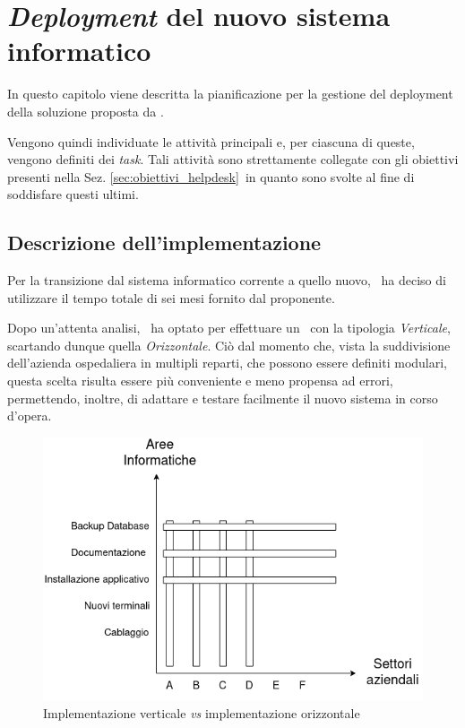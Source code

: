 \chapter{\textit{Deployment} del nuovo sistema informatico}\label{ch:implementazione}

In questo capitolo viene descritta la pianificazione per la gestione del deployment della soluzione proposta da \azienda.


Vengono quindi individuate le attività principali e, per ciascuna di queste, vengono definiti dei \textit{task}.
Tali attività sono strettamente collegate con gli obiettivi presenti nella Sez. \ref{sec:obiettivi_helpdesk}~in quanto sono svolte al fine di soddisfare questi ultimi.

\section{Descrizione dell’implementazione}\label{sec:desc_implementazione}

	Per la transizione dal sistema informatico corrente a quello nuovo, \azienda~ha deciso di utilizzare il tempo totale di sei mesi fornito dal proponente.
	
	Dopo un'attenta analisi, \azienda~ha optato per effettuare un \rollout~con la tipologia \textit{Verticale}, scartando dunque quella \textit{Orizzontale}.
	Ciò dal momento che, vista la suddivisione dell'azienda ospedaliera in multipli reparti, che possono essere definiti modulari, questa scelta risulta essere più conveniente e meno propensa ad errori, permettendo, inoltre, di adattare e testare facilmente il nuovo sistema in corso d'opera.
	
	\begin{figure}[h!]
		\centering
		\includegraphics[width=\linewidth]{img/implementazione.png}
		\caption{Implementazione verticale \textit{vs} implementazione orizzontale}
		\label{fig:implementazione}
	\end{figure}

